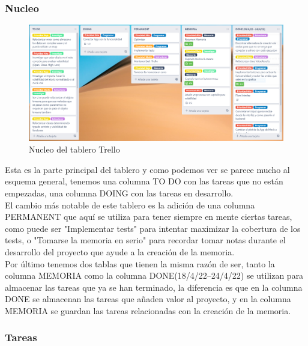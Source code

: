 \documentclass[12pt,a4paper]{article}
\begin{document}
	\subsubsection{Nucleo}
\begin{figure}[H]
\centering
  \centering
  \includegraphics[width=1\linewidth]{trello nucle}
\caption{Nucleo del tablero Trello}
\label{fig:subrgrafo}
\end{figure}
	Esta es la parte principal del tablero y como podemos ver se parece mucho al esquema general, tenemos una columna TO DO con las tareas que no están empezadas, una columna DOING con las tareas en desarrollo.\\
	El cambio más notable de este tablero es la adición de una columna PERMANENT que aquí se utiliza para tener siempre en mente ciertas tareas, como puede ser "Implementar tests" para intentar maximizar la cobertura de los tests, o "Tomarse la memoria en serio" para recordar tomar notas durante el desarrollo del proyecto que ayude a la creación de la memoria.\\
	Por último tenemos dos tablas que tienen la misma razón de ser, tanto la columna MEMORIA como la columna DONE(18/4/22--24/4/22) se utilizan para almacenar las tareas que ya se han terminado, la diferencia es que en la columna DONE se almacenan las tareas que añaden valor al proyecto, y en la columna MEMORIA se guardan las tareas relacionadas con la creación de la memoria.
	\subsubsection{Tareas}
\end{document}
